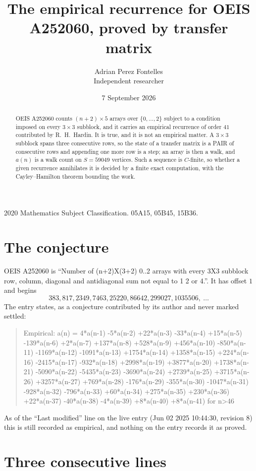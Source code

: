 \documentclass[11pt,a4paper]{article}
\title{The empirical recurrence for OEIS A252060, proved by transfer matrix}
\author{Adrian Perez Fontelles\\ \small Independent researcher}
\date{7 September 2026}
\theoremstyle{plain}
\theoremstyle{definition}
\begin{document}
\maketitle

\begin{abstract}
OEIS A252060 counts $(n+2)\times5$ arrays over $\{0,\dots,2\}$ subject to a condition imposed on
every $3\times3$ subblock, and it carries an empirical recurrence of order $41$
contributed by R.~H.~Hardin. It is true, and it is not an empirical matter. A $3\times3$
subblock spans three consecutive rows, so the state of a transfer matrix is a PAIR of
consecutive rows and appending one more row is a step; an array is then a walk, and
$a(n)$ is a walk count on $S=59049$ vertices. Such a sequence is $C$-finite, so whether a given
recurrence annihilates it is decided by a finite exact computation, with the Cayley--Hamilton
theorem bounding the work.
\end{abstract}

\noindent\small 2020 Mathematics Subject Classification. 05A15, 05B45, 15B36.\normalsize

\section{The conjecture}

OEIS A252060 is ``Number of (n+2)X(3+2) 0..2 arrays with every 3X3 subblock row, column, diagonal and antidiagonal sum not equal to 1 2 or 4.''. It has offset $1$ and begins
\[
383, 817, 2349, 7463, 25220, 86642, 299027, 1035506,\ \dots
\]
The entry states, as a conjecture contributed by its author and never marked settled:
\begin{quote}
Empirical: a(n) = 4*a(n-1) -5*a(n-2) +22*a(n-3) -33*a(n-4) +15*a(n-5) -139*a(n-6) +2*a(n-7) +137*a(n-8) +528*a(n-9) +456*a(n-10) -850*a(n-11) -1169*a(n-12) -1091*a(n-13) +1754*a(n-14) +1358*a(n-15) +224*a(n-16) -2415*a(n-17) -932*a(n-18) +2998*a(n-19) +3877*a(n-20) +1738*a(n-21) -5090*a(n-22) -5435*a(n-23) -3690*a(n-24) +2739*a(n-25) +3715*a(n-26) +3257*a(n-27) +769*a(n-28) -176*a(n-29) -355*a(n-30) -1047*a(n-31) -928*a(n-32) -796*a(n-33) +60*a(n-34) +275*a(n-35) +230*a(n-36) +22*a(n-37) -40*a(n-38) -4*a(n-39) +8*a(n-40) +8*a(n-41) for n>46
\end{quote}
As of the ``Last modified'' line on the live entry (Jun 02 2025 10:44:30, revision 8) this is still
recorded as empirical, and nothing on the entry records it as proved.

\section{Three consecutive lines}
\end{document}
